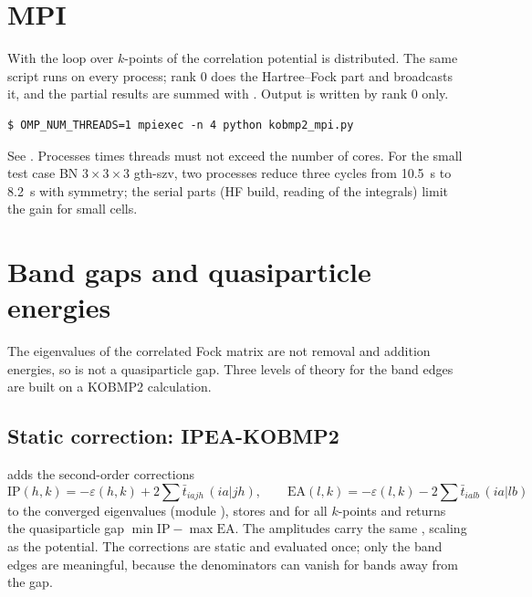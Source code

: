 \section{MPI}
\label{sec:kpt-mpi}

With  the loop over $k$-points of the correlation potential is
distributed. The same script runs on every process; rank 0 does the
Hartree--Fock part and broadcasts it, and the partial results are summed with
. Output is written by rank 0 only.

\begin{lstlisting}[style=shell]
$ OMP_NUM_THREADS=1 mpiexec -n 4 python kobmp2_mpi.py
\end{lstlisting}

See . Processes times threads must
not exceed the number of cores. For the small test case BN $3\times3\times3$
gth-szv, two processes reduce three cycles from 10.5~s to 8.2~s with symmetry;
the serial parts (HF build, reading of the integrals) limit the gain for
small cells.

\section{Band gaps and quasiparticle energies}
\label{sec:qp}

The eigenvalues of the correlated Fock matrix are not removal and addition
energies, so  is not a quasiparticle gap. Three levels of
theory for the band edges are built on a KOBMP2 calculation.

\subsection{Static correction: IPEA-KOBMP2}

 adds the second-order corrections
\begin{equation}
  \mathrm{IP}(h,k) = -\varepsilon(h,k) + 2\sum \bar t_{iajh}\,(ia|jh),\qquad
  \mathrm{EA}(l,k) = -\varepsilon(l,k) - 2\sum \bar t_{ialb}\,(ia|lb)
\end{equation}
to the converged eigenvalues (module ), stores
 and  for all $k$-points and returns the
quasiparticle gap $\min\mathrm{IP}-\max\mathrm{EA}$. The amplitudes carry
the same ,  scaling as the potential. The corrections
are static and evaluated once; only the band edges are meaningful, because
the denominators can vanish for bands away from the gap.

